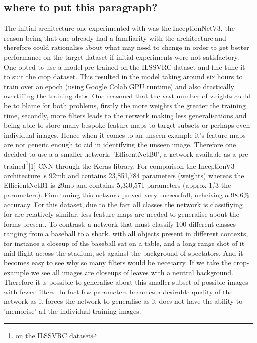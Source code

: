       \subsection{where to put this paragraph?}
      The initial architecture one experimented with was the InceptionNetV3, the reason being that one already had a familiarity with the architecture and therefore could rationalise about what may need to change in order to get better performance on the target dataset if initial experiments were not satisfactory. One opted to use a model pre-trained on the ILSSVRC dataset and fine-tune it to suit the crop dataset. This resulted in the model taking around six hours to train over an epoch (using Google Colab GPU runtime) and also drastically overtiffing the training data. One reasoned that the vast number of weights could be to blame for both problems, firstly the more weights the greater the training time, secondly, more filters leads to the network making less generalisations and being able to store many bespoke feature maps to target subsets or perhaps even individual images. Hence when it comes to an unseen example it's feature maps are not generic enough to aid in identifying the unseen image. Therefore one decided to use a a smaller network, 'EfficentNetB0', a network available as a pre-trained\footnote{on the ILSSVRC dataset}[1] CNN through the Keras library. For comparison  the InceptionV3 architecture is 92mb and contains 23,851,784 parameters (weights) whereas the EfficientNetB1 is 29mb and contains 5,330,571 parameters (approx 1/3 the parameters). Fine-tuning this network proved very successfull, acheiving a 98.6\% accuracy. For this dataset, due to the fact all classes the network is classifiying for are relatively similar, less feature maps are needed to generalise about the forms present. To contrast, a network that must classify 100 different classes ranging from a baseball to a shark. with all objects present in different contexts, for instance a closeup of the baseball sat on a table, and a long range shot of it mid flight across the stadium, set against the background of spectators. And it becomes easy to see why so many filters would be nececarry. If we take the crop-example we see all images are closeups of leaves with a neutral background. Therefore it is possible to generalise about this smaller subset of possible images with fewer filters. In fact few parameters becomes a desirable quality of the network as it forces the network to generalise as it does not have the ability to 'memorise' all the individual training images.
